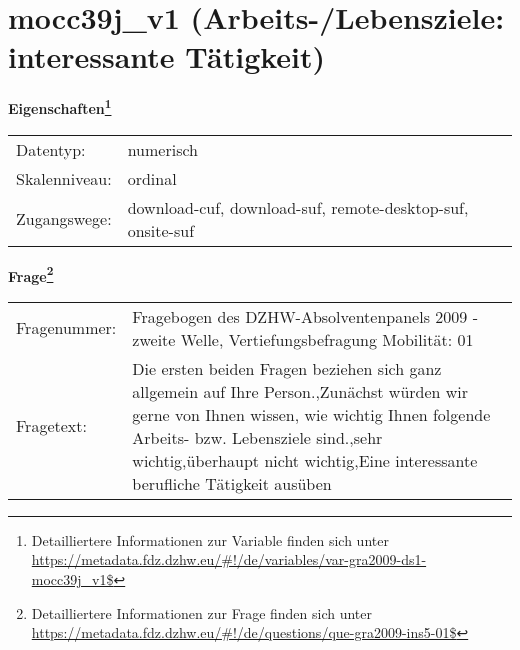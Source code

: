 
    \setcounter{footnote}{0}

    \vspace*{-1.8cm}
	\section{mocc39j\_v1 (Arbeits-/Lebensziele: interessante Tätigkeit)}
	\label{section:mocc39j_v1}



    \vspace*{0.5cm}
    \noindent\textbf{Eigenschaften\footnote{Detailliertere Informationen zur Variable finden sich unter
		\url{https://metadata.fdz.dzhw.eu/\#!/de/variables/var-gra2009-ds1-mocc39j_v1$}}}\\
	\begin{tabularx}{\hsize}{@{}lX}
	Datentyp: & numerisch \\
	Skalenniveau: & ordinal \\
	Zugangswege: &
	  download-cuf, 
	  download-suf, 
	  remote-desktop-suf, 
	  onsite-suf
 \\
    \end{tabularx}



				\vspace*{0.5cm}
                \noindent\textbf{Frage\footnote{Detailliertere Informationen zur Frage finden sich unter
		              \url{https://metadata.fdz.dzhw.eu/\#!/de/questions/que-gra2009-ins5-01$}}}\\
				\begin{tabularx}{\hsize}{@{}lX}
					Fragenummer: &
					  Fragebogen des DZHW-Absolventenpanels 2009 - zweite Welle, Vertiefungsbefragung Mobilität:
					  01
 \\
					Fragetext: & Die ersten beiden Fragen beziehen sich ganz allgemein auf Ihre Person.,Zunächst würden wir gerne von Ihnen wissen, wie wichtig Ihnen folgende Arbeits- bzw. Lebensziele sind.,sehr wichtig,überhaupt nicht wichtig,Eine interessante berufliche Tätigkeit ausüben \\
				\end{tabularx}





